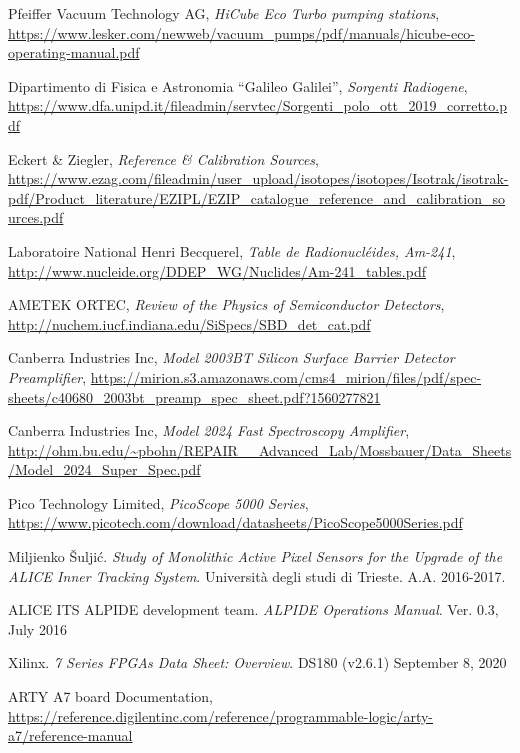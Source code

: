\begin{thebibliography}{99}

Pfeiffer Vacuum Technology AG,
\textit{HiCube Eco Turbo pumping stations},
\url{https://www.lesker.com/newweb/vacuum_pumps/pdf/manuals/hicube-eco-operating-manual.pdf}

Dipartimento di Fisica e Astronomia ``Galileo Galilei'',
\textit{Sorgenti Radiogene},
\url{https://www.dfa.unipd.it/fileadmin/servtec/Sorgenti_polo_ott_2019_corretto.pdf}

Eckert \& Ziegler,
\textit{Reference \& Calibration Sources},
\url{https://www.ezag.com/fileadmin/user_upload/isotopes/isotopes/Isotrak/isotrak-pdf/Product_literature/EZIPL/EZIP_catalogue_reference_and_calibration_sources.pdf}

Laboratoire National Henri Becquerel,
\textit{Table de Radionucléides, Am-241},
\url{http://www.nucleide.org/DDEP_WG/Nuclides/Am-241_tables.pdf}

AMETEK ORTEC,
\textit{Review of the Physics of Semiconductor Detectors},
\url{http://nuchem.iucf.indiana.edu/SiSpecs/SBD_det_cat.pdf}

Canberra Industries Inc,
\textit{Model 2003BT Silicon Surface Barrier Detector Preamplifier},
\url{https://mirion.s3.amazonaws.com/cms4_mirion/files/pdf/spec-sheets/c40680_2003bt_preamp_spec_sheet.pdf?1560277821}

Canberra Industries Inc,
\textit{Model 2024 Fast Spectroscopy Amplifier},
\url{http://ohm.bu.edu/~pbohn/REPAIR__Advanced_Lab/Mossbauer/Data_Sheets/Model_2024_Super_Spec.pdf}

Pico Technology Limited,
\textit{PicoScope 5000 Series},
\url{https://www.picotech.com/download/datasheets/PicoScope5000Series.pdf}

Miljienko \v{S}ulji\'c.
\textit{Study of Monolithic Active Pixel Sensors for the Upgrade of the ALICE Inner Tracking System}. 
Università degli studi di Trieste.
A.A. 2016-2017.

ALICE ITS ALPIDE development team.
\textit{ALPIDE Operations Manual}.
Ver. 0.3, July 2016

Xilinx.
\textit{7 Series FPGAs Data Sheet: Overview}.
DS180 (v2.6.1) September 8, 2020

ARTY A7 board Documentation,
\url{https://reference.digilentinc.com/reference/programmable-logic/arty-a7/reference-manual}


\end{thebibliography}
